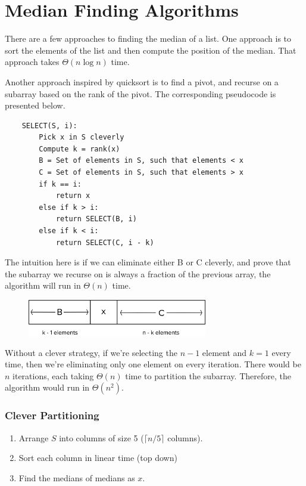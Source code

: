 \documentclass[12pt]{article}
\newcommand\ceil[1]{\lceil#1\rceil}
\begin{document}
\section*{Median Finding Algorithms}
\par{There are a few approaches to finding the median of a list.  One approach is to sort the elements of the list and then compute the position of the median. That approach takes $\Theta(n \log{n})$ time.}
\par{Another approach inspired by quicksort is to find a pivot, and recurse on a subarray based on the rank of the pivot. The corresponding pseudocode is presented below.}

\begin{lstlisting}
	SELECT(S, i):
		Pick x in S cleverly
		Compute k = rank(x)
		B = Set of elements in S, such that elements < x
		C = Set of elements in S, such that elements > x
		if k == i:
			return x
		else if k > i:
			return SELECT(B, i)
		else if k < i:
			return SELECT(C, i - k)	
\end{lstlisting}

\par{The intuition here is if we can eliminate either B or C cleverly, and prove that the subarray we recurse on is always a fraction of the previous array, the algorithm will run in $\Theta(n)$ time.}

\begin{figure}[h]
	\includegraphics[width=0.7\textwidth]{../pics/medians.png}
	\centering
\end{figure}

Without a clever strategy, if we’re selecting the $n - 1$ element and $k = 1$ every time, then we’re eliminating only one element on every iteration. There would be $n$ iterations, each taking $\Theta(n)$ time to partition the subarray. Therefore, the algorithm would run in $\Theta(n^2)$.

\subsubsection*{Clever Partitioning}
\begin{enumerate}
\item Arrange $S$ into columns of size 5 ($\ceil{n / 5}$ columns).
\item Sort each column in linear time (top down)
\item Find the medians of medians as $x$.
\end{enumerate}
\end{document}
